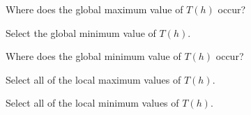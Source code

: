 \documentclass{ximera}
\begin{document}
\begin{exercise}  

Where does the global maximum value of $T(h)$ occur?

\begin{multipleChoice}
\end{multipleChoice}

\end{exercise}












\begin{exercise}  

Select the global minimum value of $T(h)$.

\begin{multipleChoice}
\end{multipleChoice}

\end{exercise}




\begin{exercise}  

Where does the global minimum value of $T(h)$ occur?

\begin{multipleChoice}
\end{multipleChoice}

\end{exercise}






\begin{exercise}  

Select all of the local maximum values of $T(h)$.

\begin{selectAll}
\end{selectAll}

\end{exercise}




\begin{exercise}  

Select all of the local minimum values of $T(h)$.

\begin{selectAll}
\end{selectAll}

\end{exercise}
\end{document}
